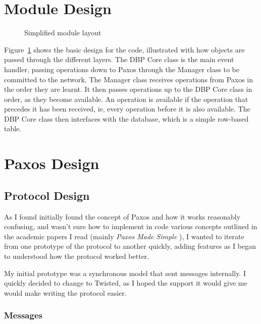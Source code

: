 \documentclass[12pt,twoside,notitlepage]{report}
\newcommand{\lwincludegraphics}[2][]{%
  \sbox{0}{\texttt{[image: \#2]}}%
  \ifdim\wd0>\linewidth
    \resizebox{\linewidth}{!}{\box0 }%
  \else
    \leavevmode\box0
  \fi}
\begin{document}
\section{Module Design}

\begin{figure}[htb]
\centering
\lwincludegraphics[scale=0.5]{figs/module-layout.eps}
\caption{\label{fig:module-layout}Simplified module layout}
\end{figure}

Figure~\ref{fig:module-layout} shows the basic design for the code, illustrated with how objects
are passed through the different layers. The DBP Core class is the main event handler, passing
operations down to Paxos through the Manager class to be committed to the network. The Manager
class receives operations from Paxos in the order they are learnt. It then passes operations up to
the DBP Core class in order, as they become available. An operation is available if the operation
that precedes it has been received, ie, every operation before it is also available. The DBP Core
class then interfaces with the database, which is a simple row-based table.

\section{Paxos Design}

\subsection{Protocol Design}

As I found initially found the concept of Paxos and how it works reasonably confusing, and wasn't
sure how to implement in code various concepts outlined in the academic papers I read (mainly
\emph{Paxos Made Simple} \cite{lamport01}), I wanted to iterate from one prototype of the protocol
to another quickly, adding features as I began to understood how the protocol worked better.

My initial prototype was a synchronous model that sent messages internally. I quickly decided to
change to Twisted, as I hoped the support it would give me would make writing the protocol easier.

\subsubsection*{Messages}

\label{sec:message-serialization}
\end{document}

